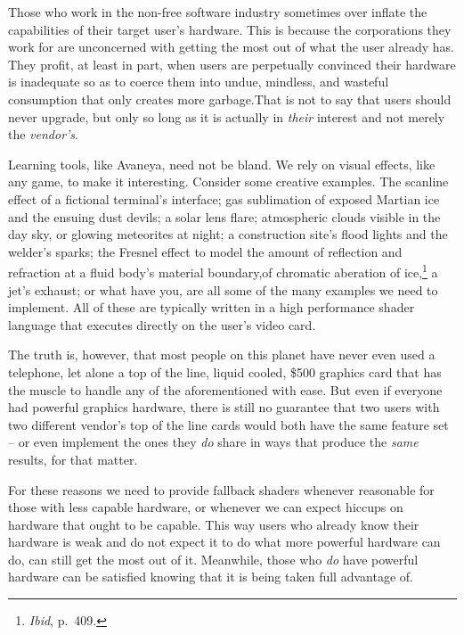 Those who work in the non-free software industry sometimes over inflate the capabilities of their target user's hardware. This is because the corporations they work for are unconcerned with getting the most out of what the user already has. They profit, at least in part, when users are perpetually convinced their hardware is inadequate so as to coerce them into undue, mindless, and wasteful consumption that only creates more garbage. That is not to say that users should never upgrade, but only so long as it is actually in {\it their} interest and not merely the {\it vendor's}.
    {}

Learning tools, like Avaneya, need not be bland. We rely on visual effects, like any game, to make it interesting. Consider some creative examples. The scanline effect of a fictional terminal's interface; gas sublimation of exposed Martian ice and the ensuing dust devils; a solar lens flare; atmospheric  clouds visible in the day sky, or glowing meteorites at night; a construction site's flood lights and the welder's sparks; the Fresnel effect to model the amount of reflection and refraction at a fluid body's material boundary, of chromatic aberation of ice,\footnote{{\it Ibid}, p.~409.} a jet's exhaust; or what have you, are all some of the many examples we need to implement. All of these are typically written in a high performance shader language that executes directly on the user's video card.

The truth is, however, that most people on this planet have never even used a telephone, let alone a top of the line, liquid cooled, \$500 graphics card that has the muscle to handle any of the aforementioned with ease. But even if everyone had powerful graphics hardware, there is still no guarantee that two users with two different vendor's top of the line cards would both have the same feature set -- or even implement the ones they {\it do} share in ways that produce the {\it same} results, for that matter. 

For these reasons we need to provide fallback shaders whenever reasonable for those with less capable hardware, or whenever we can expect hiccups on hardware that ought to be capable. This way users who already know their hardware is weak and do not expect it to do what more powerful hardware can do, can still get the most out of it. Meanwhile, those who {\it do} have powerful hardware can be satisfied knowing that it is being taken full advantage of.

